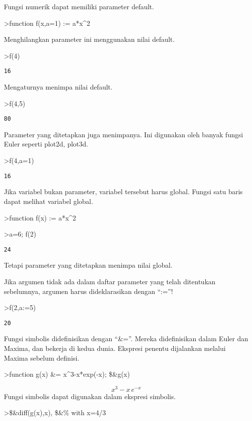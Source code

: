 \documentclass[
]{book}
\begin{document}
Fungsi numerik dapat memiliki parameter default.

\textgreater function f(x,a=1) := a*x\^{}2

Menghilangkan parameter ini menggunakan nilai default.

\textgreater f(4)

\begin{verbatim}
16
\end{verbatim}

Mengaturnya menimpa nilai default.

\textgreater f(4,5)

\begin{verbatim}
80
\end{verbatim}

Parameter yang ditetapkan juga menimpanya. Ini digunakan oleh banyak fungsi Euler seperti plot2d, plot3d.

\textgreater f(4,a=1)

\begin{verbatim}
16
\end{verbatim}

Jika variabel bukan parameter, variabel tersebut harus global. Fungsi satu baris dapat melihat variabel global.

\textgreater function f(x) := a*x\^{}2

\textgreater a=6; f(2)

\begin{verbatim}
24
\end{verbatim}

Tetapi parameter yang ditetapkan menimpa nilai global.

Jika argumen tidak ada dalam daftar parameter yang telah ditentukan sebelumnya, argumen harus dideklarasikan dengan ``:=''!

\textgreater f(2,a:=5)

\begin{verbatim}
20
\end{verbatim}

Fungsi simbolis didefinisikan dengan ``\&=''. Mereka didefinisikan dalam Euler dan Maxima, dan bekerja di kedua dunia. Ekspresi penentu dijalankan melalui Maxima sebelum definisi.

\textgreater function g(x) \&= x\^{}3-x*exp(-x); \$\&g(x)

\[x^3-x\,e^ {- x }\]Fungsi simbolis dapat digunakan dalam ekspresi simbolis.

\textgreater\$\&diff(g(x),x), \$\&\% with x=4/3
\end{document}
